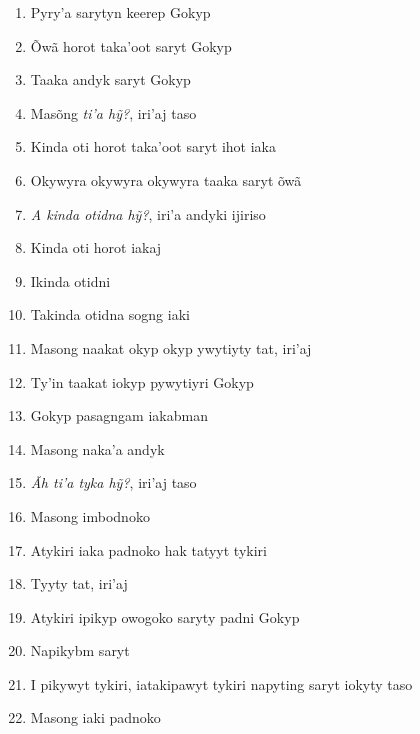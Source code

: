 \begin{enumerate}
\item Pyry'a sarytyn keerep Gokyp
\item Õwã horot taka'oot saryt Gokyp
\item Taaka andyk saryt Gokyp

\begin{center}\end{center}
\item Masõng \textit{ti'a hỹ?}, iri'aj taso
\item Kinda oti horot taka'oot saryt ihot iaka
\item Okywyra okywyra okywyra taaka saryt õwã

\begin{center}\end{center}
\item \textit{A kinda otidna hỹ?}, iri'a andyki ijiriso
\item Kinda oti horot iakaj
\item Ikinda otidni
\item Takinda otidna sogng iaki

\begin{center}\end{center}

\item Masong naakat okyp okyp ywytiyty tat, iri'aj
\item Ty'in taakat iokyp pywytiyri Gokyp
\item Gokyp pasagngam iakabman

\begin{center}\end{center}

\item Masong naka'a andyk
\item \textit{Ãh ti'a tyka hỹ?}, iri'aj taso
\item Masong imbodnoko
\item Atykiri iaka padnoko hak tatyyt tykiri
\item Tyyty tat, iri'aj

\begin{center}\end{center}

\item Atykiri ipikyp owogoko saryty padni Gokyp
\item Napikybm saryt
\item I pikywyt tykiri, iatakipawyt tykiri napyting saryt iokyty taso
\item Masong iaki padnoko


\end{enumerate}
